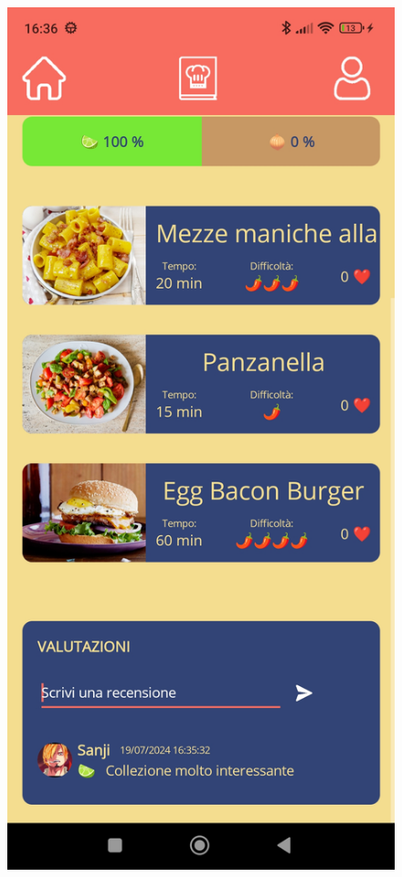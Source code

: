 ﻿\documentclass[a4paper,12pt]{report}
\begin{document}
\begin{figure}[h!]
    \begin{minipage}{.5\textwidth}
        \centering
        \includegraphics[width=0.9\linewidth]{app_images/CollectionPage2.jpg}
    \end{minipage}
\end{figure}
\end{document}
